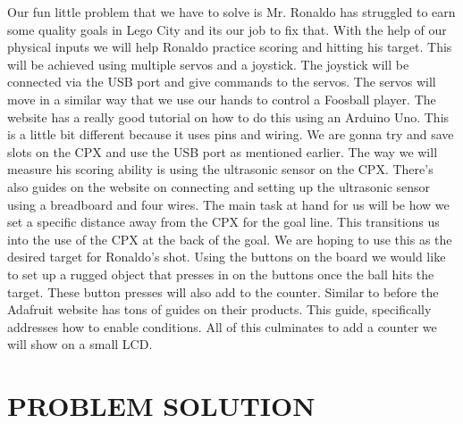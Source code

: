 \documentclass[12pt]{article}
\begin{document}
Our fun little problem that we have to solve is Mr. Ronaldo has struggled to earn some quality goals in Lego City and its our job to fix that. With the help of our physical inputs we will help Ronaldo practice scoring and hitting his target. This will be achieved using multiple servos and a joystick. The joystick will be connected via the USB port and give commands to the servos. The servos will move in a similar way that we use our hands to control a Foosball player. The website \cite{maker.pro} has a really good tutorial on how to do this using an Arduino Uno. This is a little bit different because it uses pins and wiring. We are gonna try and save slots on the CPX and use the USB port as mentioned earlier. The way we will measure his scoring ability is using the ultrasonic sensor on the CPX. There's also guides on the \cite{Adafruit_Ultrasonic_Sensor} website on connecting and setting up the ultrasonic sensor using a breadboard and four wires. The main task at hand for us will be how we set a specific distance away from the CPX for the goal line. This transitions us into the use of the CPX at the back of the goal. We are hoping to use this as the desired target for Ronaldo's shot. Using the buttons on the board we would like to set up a rugged object that presses in on the buttons once the ball hits the target. These button presses will also add to the counter. Similar to before the Adafruit website has tons of guides on their products. This guide, \cite{Adafruit_Buttons_A_and_B} specifically addresses how to enable conditions.
All of this culminates to add a counter we will show on a small LCD. 

\section{PROBLEM SOLUTION}

\end{document}
